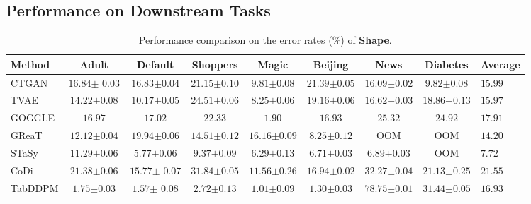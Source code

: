 \subsection{Performance on Downstream Tasks}
\label{sec:downstream_tasks}

\begin{table}[!t] 
    \centering
    \caption{Performance comparison on the error rates (\%) of \textbf{Shape}.
    } 
    \label{tbl:exp-shape}
    \small
    \begin{threeparttable}
    {
\resizebox{\columnwidth}{!}
    {
	\begin{tabular}{lccccccc|g}
            \toprule[0.8pt]
            \textbf{Method} & \textbf{Adult} & \textbf{Default} & \textbf{Shoppers} & \textbf{Magic}  & \textbf{Beijing} &  \textbf{News} & \textbf{Diabetes} & \textbf{Average}  \\
            \midrule 
            CTGAN    & $16.84${\tiny$\pm$ $0.03$} & $16.83${\tiny$\pm$$0.04$} & $21.15${\tiny$\pm0.10$} & $9.81${\tiny$\pm0.08$}  &$21.39${\tiny$\pm0.05$} &   $16.09${\tiny$\pm 0
            .02$} & $9.82${\tiny$\pm$$0.08$}  & $15.99$  \\
            TVAE     & $14.22${\tiny$\pm0.08$} & $10.17${\tiny$\pm$$0.05$} & $24.51${\tiny$\pm0.06$} & $8.25${\tiny$\pm0.06$}  &  $19.16${\tiny$\pm0.06$}  &  $16.62${\tiny$\pm0.03$} & $18.86${\tiny$\pm$$0.13$} &  $15.97$   \\
            GOGGLE   & $16.97$ & $17.02$ & $22.33$ & $1.90$  & $16.93 $ &   $25.32$ & $24.92$ &  $17.91$ \\
            GReaT     & $12.12${\tiny$\pm$$0.04$} & $19.94${\tiny$\pm$$0.06$}  & $14.51${\tiny$\pm0.12$}  &  $16.16${\tiny$\pm0.09$}   & $8.25${\tiny$\pm0.12$}  &  OOM & OOM &  $14.20$ \\
            STaSy    & $11.29${\tiny$\pm0.06$} & $5.77${\tiny$\pm0.06$} & $9.37${\tiny$\pm0.09$} & $6.29${\tiny$\pm0.13$}   & $6.71${\tiny$\pm0.03$}  &  $6.89${\tiny$\pm0.03$} & OOM &  $7.72$ \\
            CoDi  & $21.38${\tiny$\pm0.06$}  & $15.77${\tiny$\pm$ $0.07$}  & $31.84${\tiny$\pm0.05$}  & $11.56${\tiny$\pm0.26$}  & $16.94${\tiny$\pm0.02$} &    $32.27${\tiny$\pm0.04$} & $21.13${\tiny$\pm$$0.25$} &  $21.55$  \\
            TabDDPM & $1.75${\tiny$\pm0.03$}  & $1.57${\tiny$\pm$ $0.08$}  & $2.72${\tiny$\pm0.13$}  & $1.01${\tiny$\pm0.09$}   & $1.30${\tiny$\pm0.03$}  &  $78.75${\tiny$\pm0.01$} & 
            $31.44${\tiny$\pm0.05$} &  
            $16.93$ \\

\end{tabular}}}
\end{threeparttable}
\end{table}

